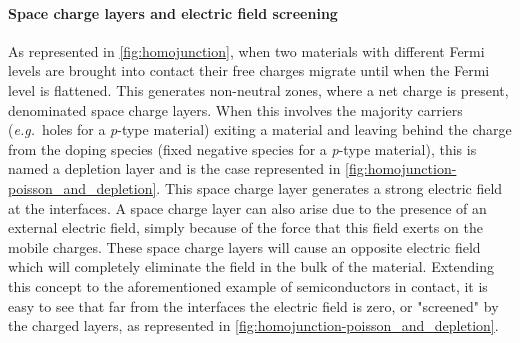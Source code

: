 		\paragraph{Space charge layers and electric field screening}\label{intro-space_charge}
		As represented in \cref{fig:homojunction}, when two materials with different Fermi levels are brought into contact their free charges migrate until when the Fermi level is flattened.
		This generates non-neutral zones, where a net charge is present, denominated space charge layers.
		When this involves the majority carriers (\textsl{e.g.}\ holes for a \textit{p}-type material) exiting a material and leaving behind the charge from the doping species (fixed negative species for a \textit{p}-type material), this is named a depletion layer and is the case represented in \cref{fig:homojunction-poisson_and_depletion}.
		This space charge layer generates a strong electric field at the interfaces.
		A space charge layer can also arise due to the presence of an external electric field, simply because of the force that this field exerts on the mobile charges.
		These space charge layers will cause an opposite electric field which will completely eliminate the field in the bulk of the material.
		Extending this concept to the aforementioned example of semiconductors in contact, it is easy to see that far from the interfaces the electric field is zero, or "screened" by the charged layers, as represented in \cref{fig:homojunction-poisson_and_depletion}.
		

